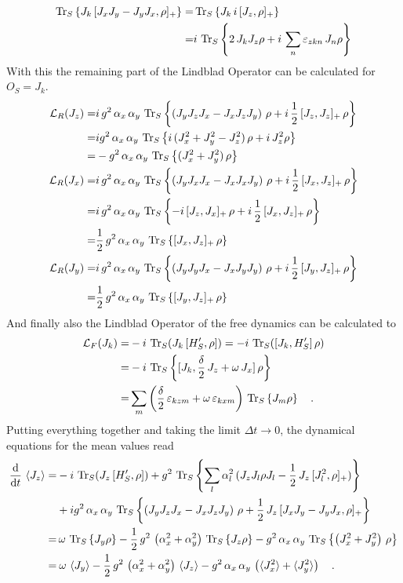 \documentclass{article}
\begin{document}
\begin{align*}
    \operatorname{Tr}_S\left\{J_k\,[J_x J_y-J_y J_x,\rho]_+\right\}=&\operatorname{Tr}_S\left\{J_k\,i\,[J_z,\rho]_+\right\}\\
    =&i\,\operatorname{Tr}_S\left\{2\,J_k J_z \rho+i\,\sum_{n}\varepsilon_{zkn}\,J_n\rho\right\}
\end{align*}
With this the remaining part of the Lindblad Operator can be calculated for $O_S=J_k$.
\begin{align*}
    \mathcal{L}_{R}(J_z)=&i\,g^2\,\alpha_x\,\alpha_y\,\operatorname{Tr}_S\left\{\left(J_y J_z J_x-J_x J_z J_y\right)\,\rho+i\,\frac{1}{2}\,[J_z,J_z]_+\,\rho\right\}\\
    =&ig^2\,\alpha_x\,\alpha_y\,\operatorname{Tr}_S\left\{i\,(J_x^2+J_y^2-J_z^2)\,\rho+i\,J_z^2\rho\right\}\\
    =&-g^2\,\alpha_x\,\alpha_y\,\operatorname{Tr}_S\left\{(J_x^2+J_y^2)\,\rho\right\}\\
    \mathcal{L}_{R}(J_x)=&i\,g^2\,\alpha_x\,\alpha_y\,\operatorname{Tr}_S\left\{\left(J_y J_x J_x-J_x J_x J_y\right)\,\rho+i\,\frac{1}{2}\,[J_x,J_z]_+\,\rho\right\}\\
    =&i\,g^2\,\alpha_x\,\alpha_y\,\operatorname{Tr}_S\left\{-i\,[J_z,J_x]_+\,\rho+i\,\frac{1}{2}\,[J_x,J_z]_+\,\rho\right\}\\
    =&\frac{1}{2}\,g^2\,\alpha_x\,\alpha_y\,\operatorname{Tr}_S\left\{[J_x,J_z]_+\,\rho\right\}\\
    \mathcal{L}_{R}(J_y)=&i\,g^2\,\alpha_x\,\alpha_y\,\operatorname{Tr}_S\left\{\left(J_y J_y J_x-J_x J_y J_y\right)\,\rho+i\,\frac{1}{2}\,[J_y,J_z]_+\,\rho\right\}\\
    =&\frac{1}{2}\,g^2\,\alpha_x\,\alpha_y\,\operatorname{Tr}_S\left\{[J_y,J_z]_+\,\rho\right\}\\
\end{align*}
And finally also the Lindblad Operator of the free dynamics can be calculated to
\begin{align*}
    \mathcal{L}_F(J_k)=&-i\,\operatorname{Tr}_S(J_k\,[H_S',\rho])=-i\,\operatorname{Tr}_S([J_k,H_S']\,\rho)\\
    =&-i\,\operatorname{Tr}_S\left\{[J_k,\frac{\delta}{2}\,J_z+\omega\,J_x]\,\rho\right\}\\
    =&\sum_m\left(\frac{\delta}{2}\,\varepsilon_{kzm}+\omega\,\varepsilon_{kxm}\right)\,\operatorname{Tr}_S\left\{J_m\rho\right\}\quad.
\end{align*}
Putting everything together and taking the limit $\Delta t\rightarrow0$, the dynamical equations for the mean values read
\begin{align*}
    \frac{\text{d}}{\text{d}t}\,\braket{J_z}=&-i\,\operatorname{Tr}_S(J_z\,[H_S',\rho])+g^2\,\operatorname{Tr}_S\left\{\sum_l\alpha_l^2\,(J_z J_l \rho J_l-\frac{1}{2}\,J_z\,[J_l^2,\rho]_+)\right\}\\
    &+ig^2\,\alpha_x\,\alpha_y\,\operatorname{Tr}_S\left\{\left(J_y J_z J_x-J_x J_z J_y\right)\,\rho+\frac{1}{2}\,J_z\,[J_x J_y-J_y J_x,\rho]_+\right\}\\
    =&\,\omega\,\operatorname{Tr}_S\left\{J_y\rho\right\}-\frac{1}{2}\,g^2\,\left(\alpha_x^2+\alpha_y^2\right)\,\operatorname{Tr}_S\left\{J_z\rho\right\}-g^2\,\alpha_x\,\alpha_y\,\operatorname{Tr}_S\left\{\left(J_x^2+J_y^2\right)\,\rho\right\}\\
    =&\:\omega\,\braket{J_y}-\frac{1}{2}\,g^2\,\left(\alpha_x^2+\alpha_y^2\right)\,\braket{J_z}-g^2\,\alpha_x\,\alpha_y\,\left(\braket{J_x^2}+\braket{J_y^2}\right)\quad.
\end{align*}
\end{document}
